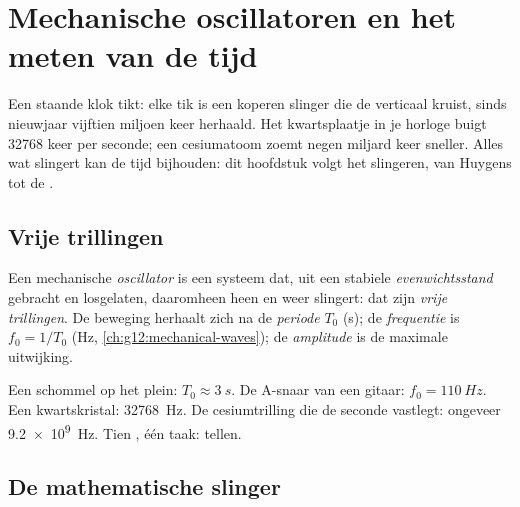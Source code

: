 \chapter{Mechanische oscillatoren en het meten van de tijd}\label{ch:g12:oscillators-and-time}

Een staande klok tikt: elke tik is een koperen slinger die de verticaal
kruist, sinds nieuwjaar vijftien miljoen keer herhaald. Het kwartsplaatje in
je horloge buigt \num{32768} keer per seconde; een cesiumatoom zoemt negen
miljard keer sneller. Alles wat slingert kan de tijd bijhouden: dit hoofdstuk
volgt het slingeren, van Huygens tot de .

\section{Vrije trillingen}

\begin{definition}\label{def:g12:oscillators-and-time:oscillator}
Een mechanische \emph{oscillator} is een systeem dat, uit
een stabiele \emph{evenwichtsstand} gebracht en
losgelaten, daaromheen heen en weer slingert: dat zijn \emph{vrije
trillingen}. De beweging herhaalt zich na de
\emph{periode} $T_0$ (\unit{s}); de
\emph{frequentie} is $f_0 = 1/T_0$ (\unit{Hz},
\cref{ch:g12:mechanical-waves}); de \emph{amplitude} is de
maximale uitwijking.
\end{definition}

\begin{example}\label{ex:g12:oscillators-and-time:zoo}
Een schommel op het plein: $T_0 \approx \qty{3}{s}$. De A-snaar van een
gitaar: $f_0 = \qty{110}{Hz}$. Een kwartskristal: \qty{32768}{Hz}. De
cesiumtrilling die de seconde vastlegt: ongeveer \qty{9.2e9}{Hz}. Tien
, één taak: tellen.
\end{example}

\section{De mathematische slinger}

